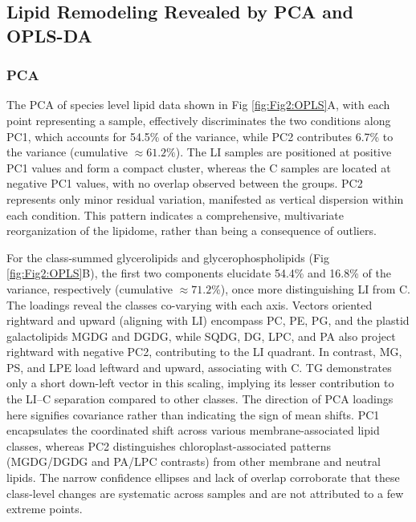 \documentclass[10pt,letterpaper]{article}
\begin{document}
\begin{itemize}
\subsection*{Lipid Remodeling Revealed by PCA and OPLS-DA}

\subsubsection*{PCA}
The PCA of species level lipid data shown in Fig \ref{fig:Fig2:OPLS}A, with each point representing a sample, effectively discriminates the two conditions along PC1, which accounts for 54.5\% of the variance, while PC2 contributes 6.7\% to the variance (cumulative $\approx 61.2\%$). The LI samples are positioned at positive PC1 values and form a compact cluster, whereas the C samples are located at negative PC1 values, with no overlap observed between the groups. PC2 represents only minor residual variation, manifested as vertical dispersion within each condition. This pattern indicates a comprehensive, multivariate reorganization of the lipidome, rather than being a consequence of outliers. 

For the class-summed glycerolipids and glycerophospholipids (Fig \ref{fig:Fig2:OPLS}B), the first two components elucidate 54.4\% and 16.8\% of the variance, respectively (cumulative $\approx 71.2\%$), once more distinguishing LI from C. The loadings reveal the classes co-varying with each axis. Vectors oriented rightward and upward (aligning with LI) encompass PC, PE, PG, and the plastid galactolipids MGDG and DGDG, while SQDG, DG, LPC, and PA also project rightward with negative PC2, contributing to the LI quadrant. In contrast, MG, PS, and LPE load leftward and upward, associating with C. TG demonstrates only a short down-left vector in this scaling, implying its lesser contribution to the LI–C separation compared to other classes. The direction of PCA loadings here signifies covariance rather than indicating the sign of mean shifts. PC1 encapsulates the coordinated shift across various membrane-associated lipid classes, whereas PC2 distinguishes chloroplast-associated patterns (MGDG/DGDG and PA/LPC contrasts) from other membrane and neutral lipids. The narrow confidence ellipses and lack of overlap corroborate that these class-level changes are systematic across samples and are not attributed to a few extreme points. 




\end{itemize}
\end{document}
